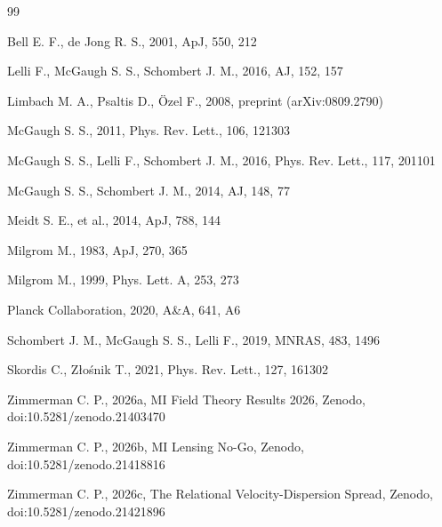 \documentclass[fleqn,usenatbib]{mnras}
\begin{document}
\begin{thebibliography}{99}

Bell E. F., de Jong R. S., 2001, ApJ, 550, 212

Lelli F., McGaugh S. S., Schombert J. M., 2016, AJ, 152, 157

Limbach M. A., Psaltis D., \"Ozel F., 2008, preprint (arXiv:0809.2790)

McGaugh S. S., 2011, Phys. Rev. Lett., 106, 121303

McGaugh S. S., Lelli F., Schombert J. M., 2016, Phys. Rev. Lett., 117, 201101

McGaugh S. S., Schombert J. M., 2014, AJ, 148, 77

Meidt S. E., et al., 2014, ApJ, 788, 144

Milgrom M., 1983, ApJ, 270, 365

Milgrom M., 1999, Phys. Lett. A, 253, 273

Planck Collaboration, 2020, A\&A, 641, A6

Schombert J. M., McGaugh S. S., Lelli F., 2019, MNRAS, 483, 1496

Skordis C., Z{\l}o\'snik T., 2021, Phys. Rev. Lett., 127, 161302

Zimmerman C. P., 2026a, MI Field Theory Results 2026, Zenodo, doi:10.5281/zenodo.21403470

Zimmerman C. P., 2026b, MI Lensing No-Go, Zenodo, doi:10.5281/zenodo.21418816

Zimmerman C. P., 2026c, The Relational Velocity-Dispersion Spread, Zenodo, doi:10.5281/zenodo.21421896

\end{thebibliography}
\end{document}
